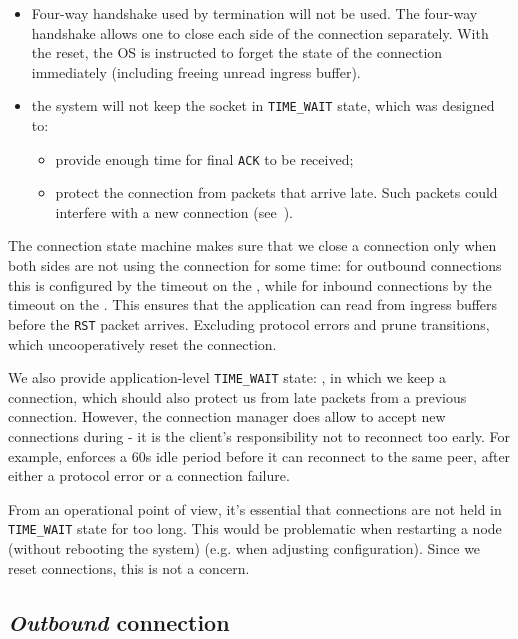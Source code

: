 \begin{itemize}
  \item Four-way handshake used by \TCP{} termination will not be used. The
    four-way handshake allows one to close each side of the connection separately.
    With the reset, the OS is instructed to forget the state of the connection
    immediately (including freeing unread ingress buffer).
  \item the system will not keep the socket in \texttt{TIME\_WAIT} state, which
    was designed to:
    \begin{itemize}
      \item provide enough time for final \texttt{ACK} to be received;
      \item protect the connection from packets that arrive late. Such
        packets could interfere with a new connection
        (see~\cite{stevens2003unix}).
    \end{itemize}
\end{itemize}

The connection state machine makes sure that we close a connection only when
both sides are not using the connection for some time: for outbound connections
this is configured by the timeout on the \OutboundIdleStateAny{}, while for
inbound connections by the timeout on the \InboundIdleStateAny{}.
This ensures that the application can read from ingress buffers
before the \texttt{RST} packet arrives.  Excluding protocol errors and prune
transitions, which uncooperatively reset the connection.

We also provide application-level \texttt{TIME\_WAIT} state:
\TerminatingState{}, in which we keep a connection, which should also protect us
from late packets from a previous connection. However, the connection manager
does allow to accept new connections during \TerminatingState{} - it is
the client's responsibility not to reconnect too early. For example,
\ptopgov{} enforces a 60s idle period before it can reconnect to the same peer, after
either a protocol error or a connection failure.

From an operational point of view, it's essential that connections are not held in
\texttt{TIME\_WAIT} state for too long. This would be problematic when
restarting a node (without rebooting the system) (e.g. when adjusting
configuration). Since we reset connections, this is not a concern.


\subsection{\textit{Outbound} connection}


